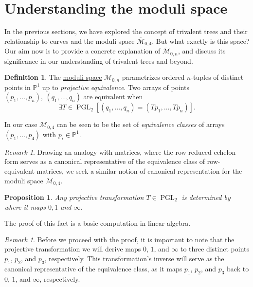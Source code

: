 \documentclass[11pt]{article}
\newcommand{\bP}{\mathbb{P}}
\newcommand{\ov}{\overline}        %
\newcommand{\cM}{\mathcal{M}}           %
\DeclareMathOperator{\PGL}{PGL} %
\newtheorem{Prop}{Proposition}         %
\theoremstyle{definition}
\newtheorem{Def}{Definition}           %
\theoremstyle{remark}
\newtheorem{Rmk}[Th]{Remark}      %
\numberwithin{theorem}{section}
\begin{document}
\section{Understanding the moduli space}

In the previous sections, we have explored the concept of trivalent trees and their relationship to curves and the moduli space $\ov{\cM}_{0,4}$. But what exactly is this space? Our aim now is to provide a concrete explanation of $\ov{\cM}_{0,n}$, and discuss its significance in our understanding of trivalent trees and beyond.

\begin{Def}
    The \underline{moduli space} $\cM_{0,n}$ parametrizes ordered $n$-tuples of distinct points in $\bP^1$ up to \emph{projective equivalence}. Two arrays of points $(p_1,\dots,p_n),\ (q_1,\dots,q_n)$ are equivalent when 
    $$\exists T\in\PGL_2\left[(q_1,\dots,q_n)=(Tp_1,\dots,Tp_n)\right].$$
\end{Def}

In our case $\cM_{0,4}$ can be seen to be the set of \emph{equivalence classes} of arrays $(p_1,\dots,p_4)$ with $p_i\in\bP^1$. 

\begin{Rmk}
    Drawing an analogy with matrices, where the row-reduced echelon form serves as a canonical representative of the equivalence class of row-equivalent matrices, we seek a similar notion of canonical representation for the moduli space $\cM_{0,4}$.
\end{Rmk}

\begin{Prop}
    Any projective transformation $T\in\PGL_2$ is determined by where it maps $0,1$ and $\infty$. 
\end{Prop}

The proof of this fact is a basic computation in linear algebra.

\begin{Rmk}
    Before we proceed with the proof, it is important to note that the projective transformation we will derive maps $0$, $1$, and $\infty$ to three distinct points $p_1$, $p_2$, and $p_3$, respectively. This transformation's inverse will serve as the canonical representative of the equivalence class, as it maps $p_1$, $p_2$, and $p_3$ back to $0$, $1$, and $\infty$, respectively.
\end{Rmk}
\end{document}
